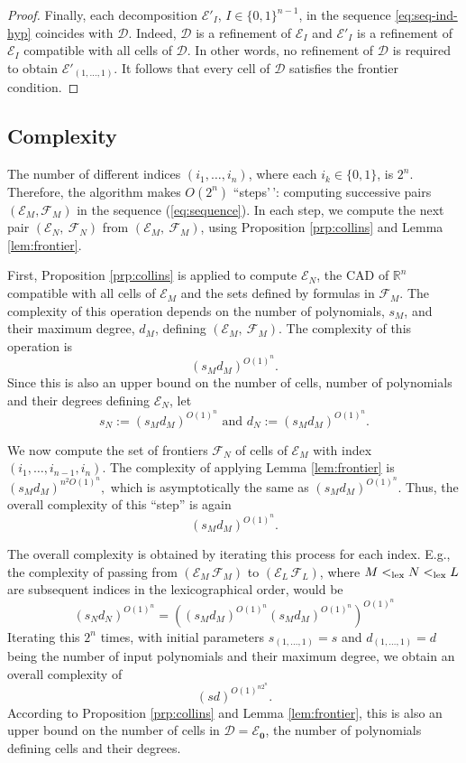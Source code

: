 \documentclass[
]{book}
\theoremstyle{definition}
\theoremstyle{definition}
\theoremstyle{definition}
\theoremstyle{definition}
\theoremstyle{remark}
\begin{document}
\begin{proof}
Finally, each decomposition \(\mathcal{E}'_I\), \(I \in \{0,1\}^{n-1}\), in the sequence \ref{eq:seq-ind-hyp} coincides with \(\mathcal{D}\). Indeed, \(\mathcal{D}\) is a refinement of \(\mathcal{E}_I\) and \(\mathcal{E}'_I\) is a refinement of \(\mathcal{E}_I\) compatible with all cells of \(\mathcal{D}\). In other words, no refinement of \(\mathcal{D}\) is required to obtain \(\mathcal{E}'_{(1,\ldots,1)}\).
It follows that every cell of \(\mathcal{D}\) satisfies the frontier condition.
\end{proof}

\hypertarget{complexity}{%
\subsection{Complexity}\label{complexity}}

The number of different indices \((i_1, \ldots, i_n)\), where each \(i_k \in \{ 0,1 \}\), is \(2^n\).
Therefore, the algorithm makes \(O(2^n)\) ``steps'\,': computing successive pairs \(({\mathcal E}_M, \mathcal{F}_M)\) in the sequence (\ref{eq:sequence}).
In each step, we compute the next pair \((\mathcal{E}_N,\ \mathcal{F}_N)\) from \((\mathcal{E}_M,\ \mathcal{F}_M)\), using Proposition \ref{prp:collins} and Lemma \ref{lem:frontier}.

First, Proposition \ref{prp:collins} is applied to compute \(\mathcal{E}_N\), the CAD of \(\mathbb{R}^n\) compatible with all cells of \(\mathcal{E}_M\) and the sets defined by formulas in \(\mathcal{F}_M\). The complexity of this operation depends on the number of polynomials, \(s_M\), and their maximum degree, \(d_M\), defining \((\mathcal{E}_M,\ \mathcal{F}_M)\).
The complexity of this operation is
\[
(s_Md_M)^{O(1)^n}.
\]
Since this is also an upper bound on the number of cells, number of polynomials and their degrees defining \(\mathcal{E}_N\), let
\[
s_N:=(s_Md_M)^{O(1)^n} \text{ and } d_N:=(s_Md_M)^{O(1)^n}.
\]

We now compute the set of frontiers \(\mathcal{F}_N\) of cells of \(\mathcal{E}_M\) with index \((i_1,\ldots,i_{n-1},i_n)\).
The complexity of applying Lemma \ref{lem:frontier} is
\((s_Md_M)^{n^2O(1)^n},\)
which is asymptotically the same as \((s_Md_M)^{O(1)^n}\).
Thus, the overall complexity of this ``step'' is again \[(s_Md_M)^{O(1)^n}.\]

The overall complexity is obtained by iterating this process for each index. E.g., the complexity of passing from \((\mathcal{E}_M\, \mathcal{F}_M)\) to \((\mathcal{E}_L\, \mathcal{F}_L)\), where \(M <_{\rm{lex}}N <_{\rm{lex}}L\) are subsequent indices in the lexicographical order, would be
\[
(s_Nd_N)^{O(1)^n} = \left((s_Md_M)^{O(1)^n}(s_Md_M)^{O(1)^n}\right)^{O(1)^n}
\]
Iterating this \(2^n\) times, with initial parameters \(s_{(1, \ldots,1)}=s\) and \(d_{(1, \ldots,1)}=d\) being the number of input polynomials and their maximum degree, we obtain an overall complexity of
\[
(sd)^{O(1)^{n2^n}}.
\]
According to Proposition \ref{prp:collins} and Lemma \ref{lem:frontier}, this is also an upper bound on the number of cells in \(\mathcal D={\mathcal E}_{\mathbf{0}}\), the number of polynomials defining cells and their degrees.
\end{document}
